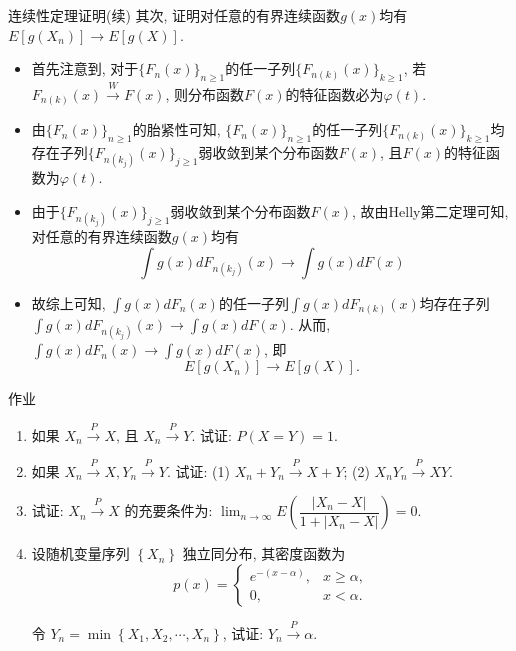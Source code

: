 \begin{frame}{连续性定理证明(续)}
其次, 证明对任意的有界连续函数$g(x)$均有 $E[g(X_n)]\rightarrow E[g(X)]$. \pause
\begin{itemize}[<+-|alert@+>]
\item 首先注意到, 对于$\{F_n(x)\}_{n\geq 1}$的任一子列$\{F_{n(k)}(x)\}_{k\geq 1}$, 若$F_{n(k)} (x)\stackrel{W}{\rightarrow} F (x)$, 则分布函数$F(x)$的特征函数必为$\varphi(t)$.
\item 由$\{F_n(x)\}_{n\geq 1}$的胎紧性可知, $\{F_n(x)\}_{n\geq 1}$的任一子列$\{F_{n(k)}(x)\}_{k\geq 1}$均存在子列$\{F_{n(k_j)}(x)\}_{j\geq 1}$弱收敛到某个分布函数$F(x)$, 且$F(x)$的特征函数为$\varphi(t)$.

\item 由于$\{F_{n(k_j)}(x)\}_{j\geq 1}$弱收敛到某个分布函数$F(x)$, 故由Helly第二定理可知, 对任意的有界连续函数$g(x)$均有
\[\int g(x)dF_{n(k_j)}(x)\rightarrow \int g(x)dF(x)\]

\item 故综上可知, $\int g(x)dF_{n}(x)$的任一子列$\int g(x)dF_{n(k)}(x)$均存在子列$\int g(x)dF_{n(k_j)}(x)\rightarrow \int g(x)dF(x)$. 从而, $\int g(x)dF_{n}(x)\rightarrow \int g(x)dF(x)$, 即 $$E[g(X_n)]\rightarrow E[g(X)].$$
\end{itemize}

\end{frame}

\begin{frame}{作业}
\begin{enumerate}
	\item $\text {如果 } X_{n} \xrightarrow{P} X \text {, 且 } X_{n} \xrightarrow{P} Y \text {. 试证: } P(X=Y)=1 \text {. }$
  \item 如果 $X_{n} \xrightarrow{P} X, Y_{n} \xrightarrow{P} Y$. 试证:
  (1) $X_{n}+Y_{n} \xrightarrow{P} X+Y$;
  (2) $X_{n} Y_{n} \xrightarrow{P} X Y$.
  \item 试证: $X_{n} \xrightarrow{P} X$  的充要条件为: $\lim_{n \rightarrow \infty}E\left(\dfrac{\left|X_{n}-X\right|}{1+\left|X_{n}-X\right|}\right)=0$.
  \item 设随机变量序列 $\left\{X_{n}\right\}$ 独立同分布, 其密度函数为
  $$p(x)=\left\{
	\begin{array}{ll}
  e^{-(x-\alpha)}, & x \geqslant \alpha, \\
  0, & x<\alpha.
  \end{array} \right.
  $$



  令 $Y_{n}=\min \left\{X_{1}, X_{2}, \cdots, X_{n}\right\}$, 试证: $Y_{n} \xrightarrow{P} \alpha$.
\end{enumerate}

\end{frame}


